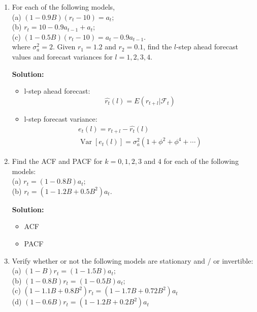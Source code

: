 \documentclass{article}
\begin{document}
\begin{enumerate}
	\item For each of the following models,\\
	(a) $(1-0.9 B)\left(r_{t}-10\right)=a_{t};$\\
	(b) $r_{t}=10-0.9 a_{t-1}+a_{t};$\\
	(c) $(1-0.5 B)\left(r_{t}-10\right)=a_{t}-0.9 a_{t-1}.$\\
	where $\sigma_a^2 = 2$. Given $r_1 = 1.2$ and $r_2 = 0.1$, find the $l$-step ahead forecast values and forecast variances for $l = 1,2,3,4$.
	
	\textbf{Solution:}
	\begin{itemize}
		\item l-step ahead forecast:
		\begin{equation*}
		\hat{r_t}(l) = E(r_{t+l} | \mathcal{F}_t)
		\end{equation*}
		
		\item l-step forecast variance:
		\begin{equation*}
		\begin{array}{c}
		e_t(l) = r_{t+l} - \hat{r_t}(l)\\
		\operatorname{Var}\left[e_t(l)\right] = \sigma_a^2 \left(1+\phi^2+\phi^4+\cdots\right)
		\end{array}
		\end{equation*}
	\end{itemize}

	\item Find the ACF and PACF for $k = 0, 1, 2, 3$ and $4$ for each of the following models:\\
	(a) $r_{t}=(1-0.8 B) a_{t};$\\
	(b) $r_{t}=\left(1-1.2 B+0.5 B^{2}\right) a_{t}.$
	
	\textbf{Solution:}
	\begin{itemize}
		\item ACF
		\item PACF
	\end{itemize}
	
	\item Verify whether or not the following models are stationary and / or invertible:\\
	(a) $(1-B) r_{t}=(1-1.5 B) a_{t};$\\
	(b) $(1-0.8 B) r_{t}=(1-0.5 B) a_{t};$\\
	(c) $\left(1-1.1 B+0.8 B^{2}\right) r_{t}=\left(1-1.7 B+0.72 B^{2}\right) a_{t}$\\
	(d) $(1-0.6 B) r_{t} =\left(1-1.2 B+0.2 B^{2}\right) a_{t}$
	

\end{enumerate}
\end{document}
